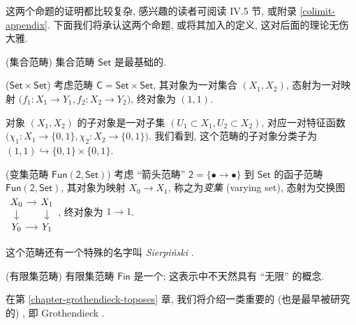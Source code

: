 
这两个命题的证明都比较复杂, 感兴趣的读者可阅读 \cite{SGL} IV.5 节, 或附录 \ref{colimit-appendix}.
下面我们将承认这两个命题, 或将其加入\topos{}的定义, 这对后面的理论无伤大雅.

\begin{example}
    [label={Set}]
    {(集合范畴)}
    集合范畴 $\mathsf {Set}$ 是最基础的\topos{}.
\end{example}

\begin{example}
    [label={Set_times_Set}]
    {($\mathsf {Set}\times\mathsf {Set}$)}
    考虑范畴 $\mathsf C = \mathsf {Set}\times\mathsf {Set}$,
    其对象为一对集合 $(X_1,X_2)$,
    态射为一对映射 $\big(f_1\colon X_1\to Y_1,f_2\colon X_2 \to Y_2\big)$,
    终对象为 $(1,1)$.
    
    对象 $(X_1,X_2)$ 的子对象是一对子集 $(U_1\subset X_1,U_2\subset X_2)$, 对应一对特征函数 $\big(\chi_1 \colon X_1 \to \{0,1\},\chi_2 \colon X_2 \to \{0,1\}\big)$.
    我们看到, 这个范畴的子对象分类子为 $(1,1) \hookrightarrow \{0,1\}\times\{0,1\}$.
\end{example}

\begin{example}
    {(变集范畴 $\mathsf {Fun}(\mathsf 2,\mathsf {Set})$)}
    考虑 ``箭头范畴'' $\mathsf 2 = \{\bullet\longrightarrow\bullet\}$ 到 $\mathsf {Set}$ 的函子范畴 $\mathsf {Fun}(\mathsf 2,\mathsf {Set})$, 其对象为映射 $X_0 \to X_1$, 称之为\emph{变集} (varying set),
    态射为交换图
$\begin{tikzcd}[ampersand replacement=\&,sep=1em]
	{X_0} \& {X_1} \\
	{Y_0} \& {Y_1}
	\arrow[from=1-1, to=1-2]
	\arrow[from=1-1, to=2-1]
	\arrow[from=2-1, to=2-2]
	\arrow[from=1-2, to=2-2]
\end{tikzcd}$,
    终对象为 $1\to 1$.
    
    这个范畴还有一个特殊的名字叫 \emph{Sierpi\'nski \topos{}}.
\end{example}

\begin{example}
    {(有限集范畴)}
    有限集范畴 $\mathsf {Fin}$ 是一个\topos{}; 这表示\topos{}中不天然具有 ``无限'' 的概念.
\end{example}

在第 \ref{chapter-grothendieck-toposes} 章, 我们将介绍一类重要的 (也是最早被研究的) \topos{}, 即 Grothendieck \topos{}.



